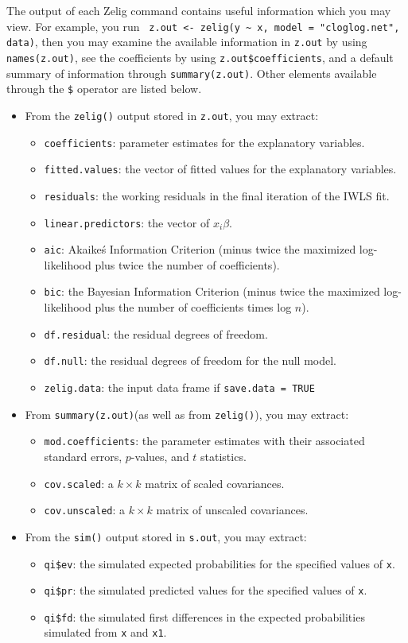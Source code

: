 The output of each Zelig command contains useful information which you may view. For example, you run \verb{ z.out <- zelig(y ~ x, model = "cloglog.net", data){, then you may examine the available information in {\tt z.out} by using {\tt names(z.out)}, see the coefficients by using {\tt z.out\$coefficients}, and a default summary of information through {\tt summary(z.out)}. Other elements available through the {\tt \$} operator are listed below.  
\begin{itemize} 
\item From the {\tt zelig()} output stored in {\tt  z.out}, you may extract: 
\begin{itemize} 
\item {\tt coefficients}: parameter estimates for the explanatory variables. 
\item {\tt fitted.values}: the vector of fitted values for the explanatory variables. 
\item {\tt residuals}: the working residuals in the final iteration of the IWLS fit.  
\item {\tt linear.predictors}: the vector of $x_{i}\beta$. 
\item {\tt aic}: Akaike\'s Information Criterion (minus twice the maximized log-likelihood plus twice the number of coefficients). 
\item {\tt bic}: the Bayesian Information Criterion (minus twice the maximized log-likelihood plus the number of coefficients times log $n$). 
\item {\tt df.residual}: the residual degrees of freedom. 
\item {\tt df.null}: the residual degrees of freedom for the null model.  
\item {\tt zelig.data}: the input data frame if {\tt save.data = TRUE}  
 
\end{itemize} 
\item From {\tt summary(z.out)}(as well as from {\tt zelig()}), you may extract: 
\begin{itemize} 
\item {\tt mod.coefficients}: the parameter estimates with their associated standard errors, $p$-values, and $t$ statistics.  
\item {\tt cov.scaled}: a $k \times k$ matrix of scaled covariances. 
\item {\tt cov.unscaled}: a $k \times k$ matrix of unscaled covariances.  
\end{itemize} 
\item From the {\tt sim()} output stored in {\tt s.out}, you may extract: 
\begin{itemize} 
\item {\tt qi\$ev}: the simulated expected probabilities for the specified values of {\tt x}. 
\item {\tt qi\$pr}: the simulated predicted values for the specified values of {\tt x}. 
\item {\tt qi\$fd}: the simulated first differences in the expected probabilities simulated from {\tt x} and {\tt x1}. 
\end{itemize} 
\end{itemize} 


